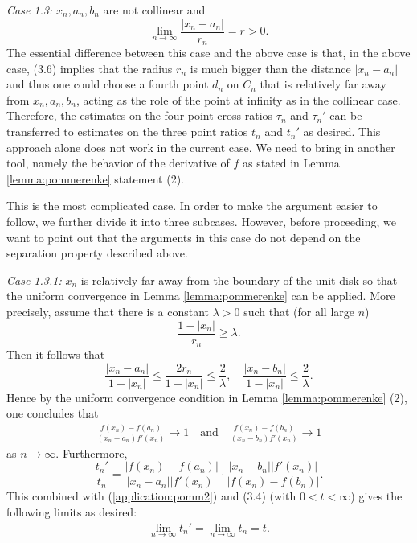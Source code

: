 \documentclass[11pt]{amsart}
\numberwithin{equation}{section}
\theoremstyle{plain}
\theoremstyle{step}
\newenvironment{case}[1]{\par\noindent\textit{Case #1:}}{\par}
\def\leq{\leqslant}
\def\geq{\geqslant}
\newcommand{\abs}[1]{\lvert#1\rvert}
\begin{document}
\vspace{0.3cm}
\begin{case}{1.3} $x_n,a_n,b_n$ are not collinear and 
\begin{equation}\lim_{n\rightarrow\infty}\frac{\abs{x_n-a_n}}{r_n}= r>0.
\end{equation}
The essential difference between this case and the above case is that, in the above case, (3.6) implies that the radius $r_n$ is much bigger than the distance $|x_n-a_n|$ and thus one could choose a fourth point $d_n$ on $C_n$ that is relatively far away from $x_n,a_n,b_n$, acting as the role of the point at infinity as in the collinear case. Therefore, the estimates on the four point cross-ratios $\tau_n$ and $\tau_n'$ can be transferred to estimates on the three point ratios $t_n$ and $t_n'$ as desired. This approach alone does not work in the current case. We need to bring in another tool, namely the behavior of the derivative of $f$ as stated in Lemma \ref{lemma:pommerenke} statement (2).

This is the most complicated case. In order to make the argument easier to follow, we further divide it into three subcases. However, before proceeding, we want to point out that the arguments in this case do not depend on the separation property described above.

\vspace{0.3cm}
\begin{case}{1.3.1} $x_n$ is relatively far away from the boundary of the unit disk so that the uniform convergence in Lemma \ref{lemma:pommerenke} can be applied. More precisely, assume that there is a constant $\lambda>0$ such that (for all large $n$) 
\begin{equation}
    \frac{1-|x_n|}{r_n}\geq\lambda.
\end{equation}
Then it follows that
\[
    \frac{\abs{x_n-a_n}}{1-\abs{x_n}}\leq\frac{2r_n}{1-|x_n|}\leq \frac{2}{\lambda}, \quad \frac{\abs{x_n-b_n}}{1-\abs{x_n}}\leq \frac{2}{\lambda}.
\]
Hence by the uniform convergence condition in Lemma \ref{lemma:pommerenke} (2),  one concludes that
\begin{align}\label{application:pomm2}
\frac{f(x_n)-f(a_n)}{(x_n-a_n)f'(x_n)}\to 1 \quad\text{and}\quad \frac{f(x_n)-f(b_n)}{(x_n-b_n)f'(x_n)}\to 1 
\end{align}
as $n\to\infty$. Furthermore,
\[
\frac{t_n'}{t_n}=\frac{\abs{f(x_n)-f(a_n)}}{\abs{x_n-a_n}\abs{f'(x_n)}}\cdot\frac{\abs{x_n-b_n}\abs{f'(x_n)}}{\abs{f(x_n)-f(b_n)}}.
\]
This combined with (\ref{application:pomm2}) and (3.4) (with $0<t<\infty$) gives the following limits as desired:
\begin{align}
    \lim_{n\to\infty}t_n'=\lim_{n\to\infty}t_n=t.
\end{align}
\end{case}


\end{case}
\end{document}
